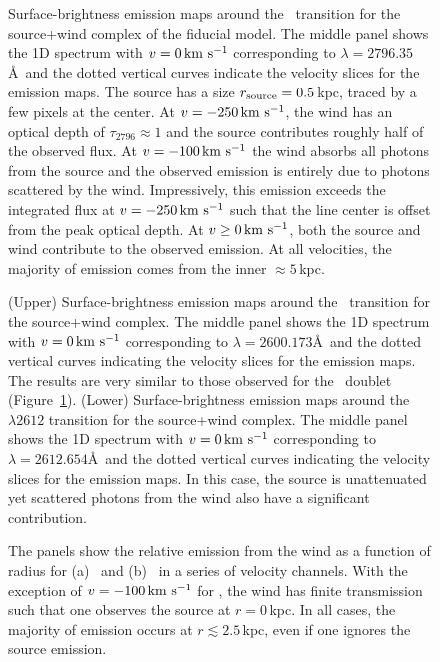 \documentclass[12pt,preprint]{aastex}
\begin{document}
\begin{figure}
\caption{
Surface-brightness emission maps around the \mgiia\ transition for the
source+wind complex of the fiducial model.  The middle panel shows the
1D spectrum with $v=0 
\, {\rm km~s^{-1}}$ corresponding to $\lambda = 2796.35$\AA\ and the dotted vertical
curves indicate the velocity slices for the emission maps.  The
source has a size $r_{\rm source} = 0.5$\,kpc, traced by a few
pixels at the center.   At $v=-250 \, {\rm km~s^{-1}}$, the wind has an optical
depth of $\tau_{2796} \approx 1$ and the source contributes
roughly half of the observed flux.  At $v=-100 \, {\rm km~s^{-1}}$ the
wind absorbs all photons from the source and the observed emission is
entirely due to photons scattered by the wind.  Impressively, this
emission exceeds the integrated flux at $v = -250\, {\rm km~s^{-1}}$ such that the
line center is offset from the peak optical depth.  At $v \ge 0
\, {\rm km~s^{-1}}$,  both the source and wind contribute to the observed emission.
At all velocities, the majority of emission comes from the inner
$\approx 5$\,kpc.
}
\label{fig:fiducial_ifu_mgii}
\end{figure}

\begin{figure}
\caption{
(Upper) Surface-brightness emission maps around the \feiib\ transition for the
source+wind complex.  The middle panel shows the 1D spectrum with $v=0
\, {\rm km~s^{-1}}$ corresponding to $\lambda = 2600.173$\AA\ and the dotted vertical
curves indicating the velocity slices for the emission maps.  
The results are very similar to those observed for the \mgiid\ doublet
(Figure~\ref{fig:fiducial_ifu_mgii}).
(Lower) Surface-brightness emission maps around the ~$\lambda
2612$ transition for the 
source+wind complex.  The middle panel shows the 1D spectrum with $v=0
\, {\rm km~s^{-1}}$ corresponding to $\lambda = 2612.654$\AA\ and the dotted vertical
curves indicating the velocity slices for the emission maps.  
In this case, the source is unattenuated yet scattered photons from
the wind also have a significant contribution. 
}
\label{fig:fiducial_ifu_feii}
\end{figure}

\begin{figure}
\caption{
The panels show the relative emission from the wind as a function of
radius for (a) \mgiia\ and (b) \feiib\ in a series of velocity
channels.  With the exception of $v = -100 \, {\rm km~s^{-1}}$ for \mgiia, the wind
has finite transmission such that one observes the source at $r =
0$\,kpc.  In all cases,  the majority of emission occurs at $r
\lesssim 2.5$\,kpc, even if one ignores the source emission.
}
\label{fig:fiducial_cuts}
\end{figure}
\end{document}
